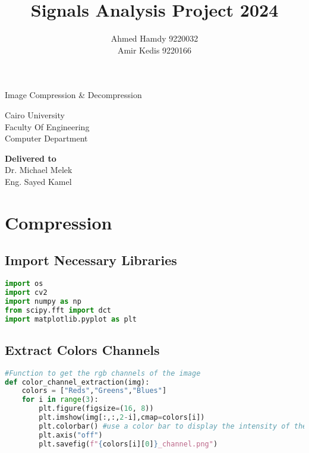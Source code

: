 \documentclass{report}
\title{Signals Analysis Project 2024}
\author{Ahmed Hamdy 9220032 \\ Amir Kedis 9220166}
\begin{document}
\begin{titlepage}
    \centering
    \vspace*{2cm}
    {\LARGE \textbf{\thetitle} \par}
    \vspace{0.25cm}
    {\LARGE Image Compression \& Decompression}
    \vspace{1.0cm}

    {\large Cairo University \\ Faculty Of Engineering \\ Computer Department \par}
    \vspace{1.0cm}
    {\LARGE \textbf{\theauthor} \par}
    \vspace{1.5cm}
    {\Large \textbf{Delivered to} \\ 
    Dr. Michael Melek \\\vspace{0.2cm}
    Eng. Sayed Kamel} 
    
    \vfill
\end{titlepage}

\tableofcontents

\newpage
\chapter{Compression}

\section{Import Necessary Libraries}
\lstset{style=mystyle}
\begin{lstlisting}[language=Python, caption=import necessary libraries,label=lst:import-libraries]
import os
import cv2
import numpy as np
from scipy.fft import dct
import matplotlib.pyplot as plt
\end{lstlisting}

\section{Extract Colors Channels}
\lstset{style=mystyle}
\begin{lstlisting}[language=Python, caption=extract rgb components,label=lst:rgb-extract]
#Function to get the rgb channels of the image 
def color_channel_extraction(img):
    colors = ["Reds","Greens","Blues"]
    for i in range(3):
        plt.figure(figsize=(16, 8))
        plt.imshow(img[:,:,2-i],cmap=colors[i])
        plt.colorbar() #use a color bar to display the intensity of the channel
        plt.axis("off")
        plt.savefig(f"{colors[i][0]}_channel.png")
\end{lstlisting}
\end{document}
